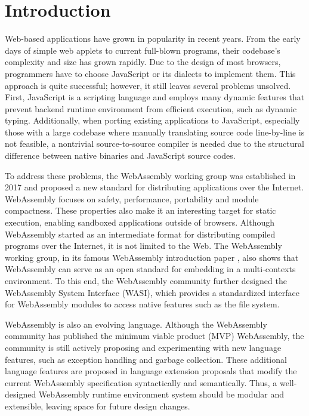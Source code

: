 \chapter{Introduction}
\label{chapter:introduction}

Web-based applications have grown in popularity in recent years. From the early
days of simple web applets to current full-blown programs, their codebase's
complexity and size has grown rapidly. Due to the design of most browsers,
programmers have to choose JavaScript or its dialects to implement them. This
approach is quite successful; however, it still leaves several problems
unsolved. First, JavaScript is a scripting language and employs many dynamic
features that prevent backend runtime environment from efficient execution,
such as dynamic typing. Additionally, when porting existing applications to
JavaScript, especially those with a large codebase where manually translating
source code line-by-line is not feasible, a nontrivial source-to-source
compiler is needed due to the structural difference between native binaries and
JavaScript source codes.

To address these problems, the WebAssembly working group was established
in 2017 and proposed a new standard for distributing applications over
the Internet. WebAssembly focuses on safety, performance, portability
and module compactness. These properties also make it an interesting
target for static execution, enabling sandboxed applications outside of
browsers. Although WebAssembly started as an intermediate format for
distributing compiled programs over the Internet, it is not limited to
the Web. The WebAssembly working group, in its famous WebAssembly introduction
paper \cite{10.1145/3062341.3062363}, also shows that WebAssembly can serve as
an open standard for embedding in a multi-contexts environment. To this end,
the WebAssembly community further designed the WebAssembly System Interface
(WASI), which provides a standardized interface for WebAssembly modules to
access native features such as the file system.

WebAssembly is also an evolving language. Although the WebAssembly community
has published the minimum viable product (MVP) WebAssembly, the community is
still actively proposing and experimenting with new language features, such as
exception handling and garbage collection. These additional language features
are proposed in language extension proposals that modify the current WebAssembly
specification syntactically and semantically. Thus, a well-designed WebAssembly
runtime environment system should be modular and extensible, leaving space for
future design changes.

